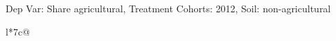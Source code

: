\begin{table}[H]
\captionlistentry[table]{}
\label{table:beaver_land_class_DVis_land_class_1_SCg1_SSNAG}
\scriptsize %
Dep Var: Share agricultural, Treatment Cohorts: 2012, Soil: non-agricultural \\
\begin{threeparttable}
\begin{tabulary}{\textwidth}{l*{7}{c}@{}}
\toprule \toprule
\noalign{\smallskip}
\noalign{\smallskip}
\midrule \bottomrule
\end{tabulary}
\medskip
\end{threeparttable}
\end{table}
